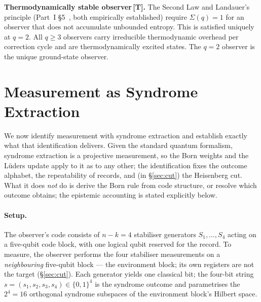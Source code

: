 \documentclass[11pt,a4paper]{article}
\newcommand{\Tmark}{\textcolor{orange!70!black}{\textbf{[T]}}}
\begin{document}
\newpage

\begin{mdframed}[backgroundcolor=Tbg,linecolor=Tcolor,linewidth=1.8pt]
\textbf{Thermodynamically stable observer\,\Tmark.}\quad
The Second Law and Landauer's principle (Part~I \S5~\cite{Hubka2026QSD}, both empirically established) require $\Sigma(q)=1$ for an observer that does not accumulate unbounded entropy. This is satisfied uniquely at $q=2$. All $q\geq3$ observers carry irreducible thermodynamic overhead per correction cycle and are thermodynamically excited states. The $q=2$ observer is the unique ground-state observer.
\end{mdframed}

\section{Measurement as Syndrome Extraction}
\label{sec:measurement}

We now identify measurement with syndrome extraction and establish exactly what that identification delivers. Given the standard quantum formalism, syndrome extraction is a projective measurement, so the Born weights and the L\"uders update apply to it as to any other; the identification fixes the outcome alphabet, the repeatability of records, and (in \S\ref{sec:cut}) the Heisenberg cut. What it does \emph{not} do is derive the Born rule from code structure, or resolve which outcome obtains; the epistemic accounting is stated explicitly below.

\paragraph{Setup.}
The observer's code consists of $n-k=4$ stabiliser generators $S_1,\ldots,S_4$ acting on a five-qubit code block, with one logical qubit reserved for the record. To measure, the observer performs the four stabiliser measurements on a \emph{neighbouring} five-qubit block --- the environment block; its own registers are not the target (\S\ref{sec:cut}). Each generator yields one classical bit; the four-bit string $s=(s_1,s_2,s_3,s_4)\in\{0,1\}^4$ is the syndrome outcome and parametrises the $2^4=16$ orthogonal syndrome subspaces of the environment block's Hilbert space.
\end{document}
